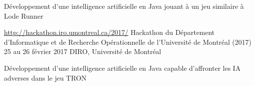 \begin{cventries}
    {
      \begin{cvitems}
      \item{Développement d'une intelligence artificielle en Java jouant à un jeu similaire à Lode Runner}
      \end{cvitems}
    }
    \cventry
  {\url{http://hackathon.iro.umontreal.ca/2017/}}
  {Hackathon du Département d'Informatique et de Recherche Opérationnelle de l'Université de Montréal (2017)}
    {25 au 26 février 2017}
    {DIRO, Université de Montréal}
    {
      \begin{cvitems}
      \item{Développement d'une intelligence artificielle en Java capable d'affronter les IA adverses dans le jeu TRON}
      \end{cvitems}
    }
\end{cventries}
